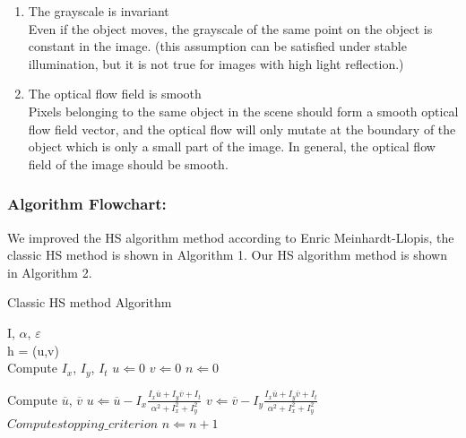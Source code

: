 \documentclass[runningheads,a4paper]{llncs}
\begin{document}
			\begin{enumerate}
			\item The grayscale is invariant\\
			Even if the object moves, the grayscale of the same point on the object is constant in the image. (this assumption can be satisfied under stable illumination, but it is not true for images with high light reflection.)\\
			\item The optical flow field is smooth\\
			Pixels belonging to the same object in the scene should form a smooth optical flow field vector, and the optical flow will only mutate at the boundary of the object which is only a small part of the image. In general, the optical flow field of the image should be smooth. \\
			\end{enumerate}
\vbox{}

		\subsubsection{Algorithm Flowchart: }
			We improved the HS algorithm method according to Enric Meinhardt-Llopis, the classic HS method is shown in Algorithm 1.\cite{5} Our HS algorithm method is shown in Algorithm 2.\\

				\begin{algorithm}[h]
				\caption{Classic HS method Algorithm}
				\begin{algorithmic}[1]

				\REQUIRE I, $\alpha$, $\varepsilon$ \\ 
				\ENSURE h = (u,v)\\
				\STATE Compute $I_x$, $I_y$, $I_t$
				\STATE $u \Leftarrow 0$
				\STATE $v \Leftarrow 0$
				\STATE $n \Leftarrow 0$

				\STATE Compute $\overline{u}$, $\overline{v}$
				\STATE $u \Leftarrow \overline{u} - I_x \frac{I_x\overline{u} + I_y\overline{v} + I_t}{\alpha^2 + I_x^2 + I_y^2}$ 
				\STATE $v \Leftarrow \overline{v} - I_y \frac{I_x\overline{u} + I_y\overline{v} + I_t}{\alpha^2 + I_x^2 + I_y^2}$
				\STATE $Compute stopping\_criterion$ 
				\STATE $n \Leftarrow n + 1$ 
				\ENDWHILE

				\label{code:recentEnd}
				\end{algorithmic}
				\end{algorithm}
\end{document}
